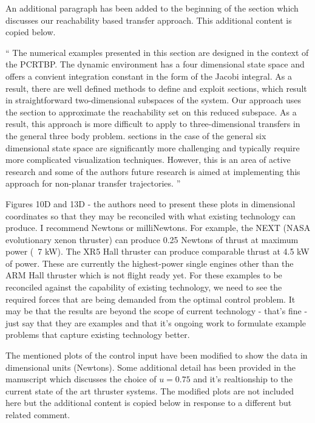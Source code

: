 \documentclass[11pt]{article}
\newenvironment{correction}{\begin{list}{}{\setlength{\leftmargin}{1cm}\setlength{\rightmargin}{1cm}}\vspace{\parsep}\item[]``}{''\end{list}}
\begin{document}
\begin{enumerate}
An additional paragraph has been added to the beginning of the section which discusses our reachability based transfer approach.
This additional content is copied below.

\begin{correction}
The numerical examples presented in this section are designed in the context of the PCRTBP.
The dynamic environment has a four dimensional state space and offers a convient integration constant in the form of the Jacobi integral.
As a result, there are well defined methods to define and exploit \Poincare sections, which result in straightforward two-dimensional subspaces of the system.
Our approach uses the \Poincare section to approximate the reachability set on this reduced subspace.
As a result, this approach is more difficult to apply to three-dimensional transfers in the general three body problem.
\Poincare sections in the case of the general six dimensional state space are significantly more challenging and typically require more complicated visualization techniques. 
However, this is an area of active research and some of the authors future research is aimed at implementing this approach for non-planar transfer trajectories.
\end{correction}

\item
    \begin{itshape}
Figures 10D and 13D - the authors need to present these plots in dimensional coordinates so that they may be reconciled with what existing technology can produce.  I recommend Newtons or milliNewtons.  For example, the NEXT (NASA evolutionary xenon thruster) can produce 0.25 Newtons of thrust at maximum power (~7 kW).  The XR5 Hall thruster can produce comparable thrust at 4.5 kW of power.  These are currently the highest-power single engines other than the ARM Hall thruster which is not flight ready yet.  For these examples to be reconciled against the capability of existing technology, we need to see the required forces that are being demanded from the optimal control problem.  It may be that the results are beyond the scope of current technology - that's fine - just say that they are examples and that it's ongoing work to formulate example problems that capture existing technology better.
\end{itshape}

The mentioned plots of the control input have been modified to show the data in dimensional units (Newtons). 
Some additional detail has been provided in the manuscript which discusses the choice of \( u = 0.75 \) and it's realtionship to the current state of the art thruster systems.
The modified plots are not included here but the additional content is copied below in response to a different but related comment.


\end{enumerate}
\end{document}
